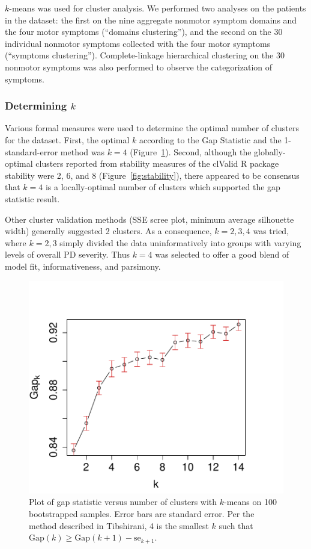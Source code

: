 \documentclass[preprint,5p]{elsarticle} %
\begin{document}
$k$-means was used for cluster analysis. We performed two analyses on the
patients in the dataset: the first on the nine aggregate nonmotor symptom
domains and the four motor symptoms (``domains clustering''), and the second on the 30 individual
nonmotor symptoms collected with the four motor symptoms (``symptoms clustering''). Complete-linkage
hierarchical clustering on the 30 nonmotor symptoms was also performed to observe the
categorization of symptoms.

\subsubsection{Determining $k$}

Various formal measures were used to determine the optimal number of
clusters for the dataset. First, the optimal $k$ according to the Gap Statistic and the
1-standard-error method\cite{tibshirani01gap} was $k = 4$ (Figure~\ref{fig:gap}). Second, although
the globally-optimal clusters reported from stability measures of the clValid R package
\cite{brock11clvalid} stability were 2, 6, and 8 (Figure~\ref{fig:stability}), there appeared to be
consensus that $k = 4$ is a locally-optimal number of clusters which supported the gap statistic
result.

Other cluster validation methods (SSE scree plot, minimum average silhouette width) generally
suggested 2 clusters. As a consequence, $k = 2, 3, 4$ was tried, where $k = 2, 3$ simply divided
the data uninformatively into groups with varying levels of overall PD severity. Thus $k = 4$ was
selected to offer a good blend of model fit, informativeness, and parsimony.

\begin{figure}[h]
  \centering
  \includegraphics[width=\linewidth]{gap-statistic.pdf}
  \caption{Plot of gap statistic versus number of clusters with $k$-means on 100 bootstrapped
    samples. Error bars are standard error. Per the method described in Tibshirani\cite{tibshirani01gap}, 4 is the smallest $k$ such
    that $\text{Gap}(k) \geq \text{Gap}(k + 1) - \text{se}_{k + 1}$.}
  \label{fig:gap}
\end{figure}
\end{document}

